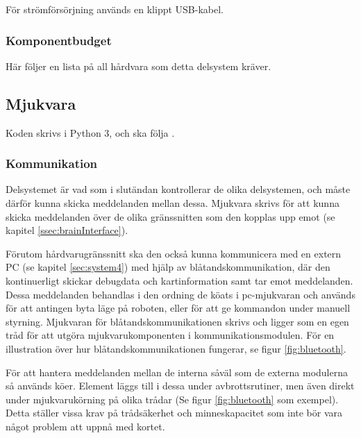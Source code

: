 \documentclass[a4paper,11pt]{article}
\begin{document}
För strömförsörjning används en klippt USB-kabel.

\subsubsection{Komponentbudget}
Här följer en lista på all hårdvara som detta delsystem kräver.

\begin{HardwareList}
\end{HardwareList}

\subsection{Mjukvara}
Koden skrivs i Python 3, och ska följa \cite{pep8}.

\subsubsection{Kommunikation}
Delsystemet är vad som i slutändan kontrollerar de olika delsystemen, och måste därför kunna skicka meddelanden mellan dessa. Mjukvara skrivs för att kunna skicka meddelanden över de olika gränssnitten som den kopplas upp emot (se kapitel \ref{ssec:brainInterface}).

Förutom hårdvarugränssnitt ska den också kunna kommunicera med en extern PC (se kapitel \ref{sec:system4}) med hjälp av blåtandskommunikation, där den kontinuerligt skickar debugdata och kartinformation samt tar emot meddelanden. Dessa meddelanden behandlas i den ordning de köats i pc-mjukvaran och används för att antingen byta läge på roboten, eller för att ge kommandon under manuell styrning. Mjukvaran för blåtandskommunikationen skrivs och ligger som en egen tråd för att utgöra mjukvarukomponenten i kommunikationsmodulen. För en illustration över hur blåtandskommunikationen fungerar, se figur \ref{fig:bluetooth}.

För att hantera meddelanden mellan de interna såväl som de externa modulerna så används köer. Element läggs till i dessa under avbrottsrutiner, men även direkt under mjukvarukörning på olika trådar (Se figur \ref{fig:bluetooth} som exempel). Detta ställer vissa krav på trådsäkerhet och minneskapacitet som inte bör vara något problem att uppnå med kortet.
\end{document}
